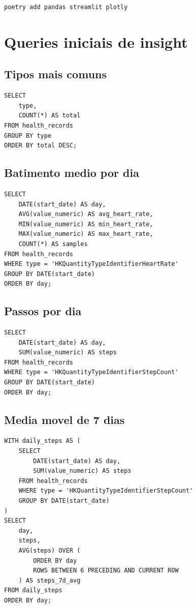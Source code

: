 \begin{lstlisting}[style=devbutterbash]
poetry add pandas streamlit plotly
\end{lstlisting}

\section{Queries iniciais de insight}

\subsection{Tipos mais comuns}

\begin{lstlisting}[style=devbuttersql]
SELECT
    type,
    COUNT(*) AS total
FROM health_records
GROUP BY type
ORDER BY total DESC;
\end{lstlisting}

\subsection{Batimento medio por dia}

\begin{lstlisting}[style=devbuttersql]
SELECT
    DATE(start_date) AS day,
    AVG(value_numeric) AS avg_heart_rate,
    MIN(value_numeric) AS min_heart_rate,
    MAX(value_numeric) AS max_heart_rate,
    COUNT(*) AS samples
FROM health_records
WHERE type = 'HKQuantityTypeIdentifierHeartRate'
GROUP BY DATE(start_date)
ORDER BY day;
\end{lstlisting}

\subsection{Passos por dia}

\begin{lstlisting}[style=devbuttersql]
SELECT
    DATE(start_date) AS day,
    SUM(value_numeric) AS steps
FROM health_records
WHERE type = 'HKQuantityTypeIdentifierStepCount'
GROUP BY DATE(start_date)
ORDER BY day;
\end{lstlisting}

\subsection{Media movel de 7 dias}

\begin{lstlisting}[style=devbuttersql]
WITH daily_steps AS (
    SELECT
        DATE(start_date) AS day,
        SUM(value_numeric) AS steps
    FROM health_records
    WHERE type = 'HKQuantityTypeIdentifierStepCount'
    GROUP BY DATE(start_date)
)
SELECT
    day,
    steps,
    AVG(steps) OVER (
        ORDER BY day
        ROWS BETWEEN 6 PRECEDING AND CURRENT ROW
    ) AS steps_7d_avg
FROM daily_steps
ORDER BY day;
\end{lstlisting}


